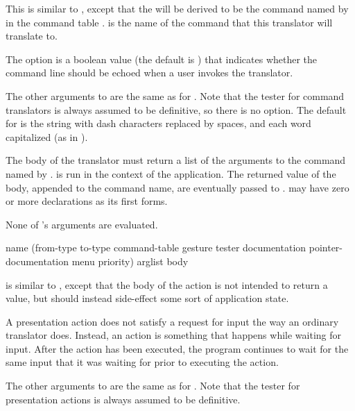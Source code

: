 This is similar to , except that the
 will be derived to be the command named by  in
the command table .   is the name of the
command that this translator will translate to.

The  option is a boolean value (the default is ) that
indicates whether the command line should be echoed when a user invokes the
translator.

The other arguments to  are the
same as for .  Note that the tester for
command translators is always assumed to be definitive, so there is no
 option. The default for  is
the string  with dash characters replaced by spaces, and each
word capitalized (as in ).

The body of the translator must return a list of the arguments to the command
named by .   is run in the context of the
application.  The returned value of the body, appended to the command name, are
eventually passed to .   may have zero or
more declarations as its first forms.

None of 's arguments are evaluated.


 {name 
                                        (from-type to-type command-table 
                                         \key gesture tester
                                              documentation pointer-documentation
                                              menu priority)
                                        arglist
                                        \body body}

 is similar to ,
except that the body of the action is not intended to return a value, but should
instead side-effect some sort of application state.

A presentation action does not satisfy a request for input the way an ordinary
translator does.  Instead, an action is something that happens while waiting for
input.  After the action has been executed, the program continues to wait for
the same input that it was waiting for prior to executing the action.

The other arguments to  are the same as for
.  Note that the tester for presentation
actions is always assumed to be definitive.

